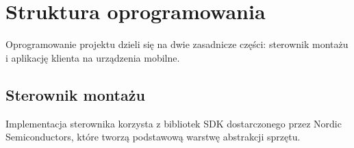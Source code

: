 \section{Struktura oprogramowania}

Oprogramowanie projektu dzieli się na dwie zasadnicze części: sterownik montażu
i aplikację klienta na urządzenia mobilne.

\subsection{Sterownik montażu}

Implementacja sterownika korzysta z bibliotek SDK dostarczonego przez Nordic
Semiconductors, które tworzą podstawową warstwę abstrakcji sprzętu.
